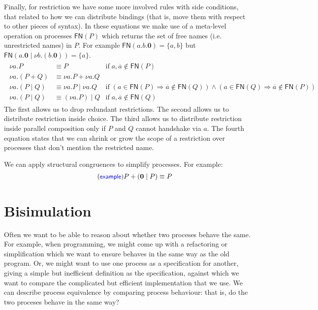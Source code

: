 \documentclass{article}
\newcommand{\exampleLabel}{\tag{\small{\textcolor{blue}{\textsf{example}}}}}
\theoremstyle{definition}
\begin{document}
Finally, for restriction we have some more involved rules
with side conditions, that related to how we can distribute
bindings (that is, move them with respect to other pieces
of syntax). In these equations we make use of a meta-level
operation on processes $\mathsf{FN}(P)$ which returns the
set of free names (i.e. unrestricted names) in $P$.
For example $\mathsf{FN}(a.b.\mathbf{0}) = \{a, b\}$
but $\mathsf{FN}(a.\mathbf{0} \mid \nu b . (b . \mathbf{0})) =
\{a \}$.
%
\begin{align*}
  \begin{array}{rll}
  \nu a . P & \equiv P & \text{if} \; a,
  \overline{a} \not\in \mathsf{FN}(P)  \\
 \nu a . (P + Q) & \equiv \nu a . P + \nu a . Q \\
 \nu a. (P \mid Q) & \equiv \nu a. P \mid \nu a. Q & \text{if}\;(a
  \in \mathsf{FN}(P) \Rightarrow \overline{a} \notin \mathsf{FN}(Q))
 \wedge (a \in \mathsf{FN}(Q) \Rightarrow \overline{a} \not\in
  \mathsf{FN}(P))  \\
\nu a. (P \mid Q) & \equiv (\nu a. P) \mid Q &\text{if}\;a,
                                               \overline{a} \not\in
                                               \mathsf{FN}(Q)
\end{array}
\end{align*}
%
The first allows us to drop redundant restrictions. The second allows
us to distribute restriction inside choice. The third allows us to
distribute restriction inside parallel composition only if
$P$ and $Q$ cannot handshake via $a$. The fourth equation
states that we can shrink or grow the scope of a restriction
over processes that don't mention the restricted name.

We can apply structural congruences to simplify processes. For
example:
%
\begin{align*}
  \exampleLabel{}
  P + (\mathbf{0} \mid P) \equiv P
\end{align*}
%

\section{Bisimulation}

Often we want to be able to reason about whether two proceses behave
the same. For example, when programming, we might come up with a
refactoring or simplification which we want to ensure behaves in the
same way as the old program. Or, we might want to use one process
as a specification for another, giving a simple but inefficient
definition as the specification, against which we want to compare the
complicated but efficient implementation that we use. We can
describe process equivalence by comparing process behaviour:
that is, do the two proceses behave in the same way?
\end{document}
